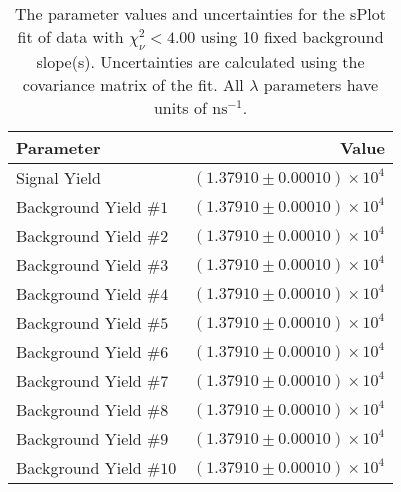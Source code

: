 
\begin{table}
    \begin{center}
        \begin{tabular}{lr}\toprule
            Parameter & Value \\\midrule
            Signal Yield & $(1.37910 \pm 0.00010) \times 10^{4}$ \\
            Background Yield $\#1$ & $(1.37910 \pm 0.00010) \times 10^{4}$ \\
            Background Yield $\#2$ & $(1.37910 \pm 0.00010) \times 10^{4}$ \\
            Background Yield $\#3$ & $(1.37910 \pm 0.00010) \times 10^{4}$ \\
            Background Yield $\#4$ & $(1.37910 \pm 0.00010) \times 10^{4}$ \\
            Background Yield $\#5$ & $(1.37910 \pm 0.00010) \times 10^{4}$ \\
            Background Yield $\#6$ & $(1.37910 \pm 0.00010) \times 10^{4}$ \\
            Background Yield $\#7$ & $(1.37910 \pm 0.00010) \times 10^{4}$ \\
            Background Yield $\#8$ & $(1.37910 \pm 0.00010) \times 10^{4}$ \\
            Background Yield $\#9$ & $(1.37910 \pm 0.00010) \times 10^{4}$ \\
            Background Yield $\#10$ & $(1.37910 \pm 0.00010) \times 10^{4}$ \\\bottomrule
        \end{tabular}
        \caption{The parameter values and uncertainties for the sPlot fit of data with $\chi^2_\nu < 4.00$ using 10 fixed background slope(s). Uncertainties are calculated using the covariance matrix of the fit. All $\lambda$ parameters have units of $\si{\nano\second}^{-1}$.}
    \end{center}
\end{table}
